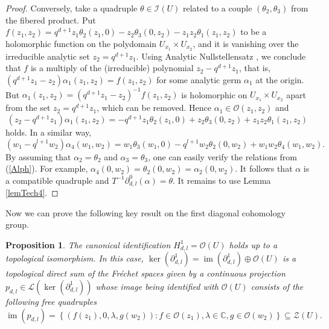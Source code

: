 \documentclass[12pt,reqno]{amsart}%
\theoremstyle{plain}
\newtheorem{proposition}{Proposition}
\numberwithin{theorem}{section} \numberwithin{equation}{section}
\numberwithin{lemma}{section}
\numberwithin{remark}{section}
\numberwithin{example}{section}
\numberwithin{proposition}{section}
\numberwithin{definition}{section}
\numberwithin{corollary}{section}
\begin{document}
\begin{proof}
Conversely, take a quadruple $\theta\in\mathcal{I}\left(  U\right)  $ related
to a couple $\left(  \theta_{2},\theta_{3}\right)  $ from the fibered product.
Put $f\left(  z_{1},z_{2}\right)  =q^{d+1}z_{1}\theta_{2}\left(
z_{1},0\right)  -z_{2}\theta_{3}\left(  0,z_{2}\right)  -z_{1}z_{2}\theta
_{1}\left(  z_{1},z_{2}\right)  $ to be a holomorphic function on the
polydomain $U_{x_{1}}\times U_{x_{2}}$, and it is vanishing over the
irreducible analytic set $z_{2}=q^{d+1}z_{1}$. Using Analytic Nullstellensatz
\cite[II.E.18]{GRo}, we conclude that $f$ is a multiply of the (irreducible)
polynomial $z_{2}-q^{d+1}z_{1}$, that is, $\left(  q^{d+1}z_{1}-z_{2}\right)
\alpha_{1}\left(  z_{1},z_{2}\right)  =f\left(  z_{1},z_{2}\right)  $ for some
analytic germ $\alpha_{1}$ at the origin. But $\alpha_{1}\left(  z_{1}%
,z_{2}\right)  =\left(  q^{d+1}z_{1}-z_{2}\right)  ^{-1}f\left(  z_{1}%
,z_{2}\right)  $ is holomorphic on $U_{x_{1}}\times U_{x_{2}}$ apart from the
set $z_{2}=q^{d+1}z_{1}$, which can be removed. Hence $\alpha_{1}%
\in\mathcal{O}\left(  z_{1},z_{2}\right)  $ and
\[
\left(  z_{2}-q^{d+1}z_{1}\right)  \alpha_{1}\left(  z_{1},z_{2}\right)
=-q^{d+1}z_{1}\theta_{2}\left(  z_{1},0\right)  +z_{2}\theta_{3}\left(
0,z_{2}\right)  +z_{1}z_{2}\theta_{1}\left(  z_{1},z_{2}\right)
\]
holds. In a similar way,
\[
\left(  w_{1}-q^{l+1}w_{2}\right)  \alpha_{4}\left(  w_{1},w_{2}\right)
=w_{1}\theta_{3}\left(  w_{1},0\right)  -q^{l+1}w_{2}\theta_{2}\left(
0,w_{2}\right)  +w_{1}w_{2}\theta_{4}\left(  w_{1},w_{2}\right)  .
\]
By assuming that $\alpha_{2}=\theta_{2}$ and $\alpha_{3}=\theta_{3}$, one can
easily verify the relations from (\ref{Alph}). For example, $\alpha_{4}\left(
0,w_{2}\right)  =\theta_{2}\left(  0,w_{2}\right)  =\alpha_{2}\left(
0,w_{2}\right)  $. It follows that $\alpha$ is a compatible quadruple and
$T^{-1}\partial_{d,l}^{0}\left(  \alpha\right)  =\theta$. It remains to use
Lemma \ref{lemTech4}.
\end{proof}

Now we can prove the following key result on the first diagonal cohomology group.

\begin{proposition}
\label{propTechE}The canonical identification $H_{d,l}^{1}=\mathcal{O}\left(
U\right)  $ holds up to a topological isomorphism. In this case, $\ker\left(
\partial_{d,l}^{1}\right)  =\operatorname{im}\left(  \partial_{d,l}%
^{1}\right)  \oplus\mathcal{O}\left(  U\right)  $ is a topological direct sum
of the Fr\'{e}chet spaces given by a continuous projection $p_{d,l}%
\in\mathcal{L}\left(  \ker\left(  \partial_{d,l}^{1}\right)  \right)  $ whose
image being identified with $\mathcal{O}\left(  U\right)  $ consists of the
following free quadruples
\[
\operatorname{im}\left(  p_{d,l}\right)  =\left\{  \left(  f\left(
z_{1}\right)  ,0,\lambda,g\left(  w_{2}\right)  \right)  :f\in\mathcal{O}%
\left(  z_{1}\right)  ,\lambda\in\mathbb{C},g\in\mathcal{O}\left(
w_{2}\right)  \right\}  \subseteq\mathcal{Z}\left(  U\right)  .
\]

\end{proposition}
\end{document}
